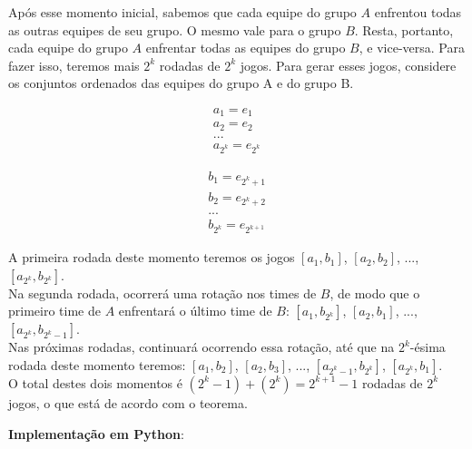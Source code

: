 \documentclass{article}
\begin{document}
Após esse momento inicial, sabemos que cada equipe do grupo $A$ enfrentou todas as outras equipes de seu grupo. O mesmo vale para o grupo $B$. Resta, portanto, cada equipe do grupo $A$ enfrentar todas as equipes do grupo $B$, e vice-versa. Para fazer isso, teremos mais $2^k$ rodadas de $2^k$ jogos. Para gerar esses jogos, considere os conjuntos ordenados das equipes do grupo A e do grupo B.

\begin{gather}
a_1 = e_1 \\
a_2 = e_2 \\
... \\
a_{2^k} = e_{2^k}\end{gather}

\begin{gather}
b_1 = e_{2^k + 1} \\
b_2 = e_{2^k + 2} \\
... \\
b_{2^k} = e_{2^{k+1}}\end{gather}

A primeira rodada deste momento teremos os jogos $[a_1, b_1]$, $[a_2, b_2]$, ..., $[a_{2^k}, b_{2^k}]$.\\

Na segunda rodada, ocorrerá uma rotação nos times de $B$, de modo que o primeiro time de $A$ enfrentará o último time de $B$: $[a_1, b_{2^k}]$, $[a_2, b_1]$, ..., $[a_{2^k}, b_{2^k-1}]$.\\

Nas próximas rodadas, continuará ocorrendo essa rotação, até que na $2^k$-ésima rodada deste momento teremos: $[a_1, b_2]$, $[a_2, b_3]$, ..., $[a_{2^k-1}, b_{2^k}]$, $[a_{2^k}, b_1]$.\\

O total destes dois momentos é $(2^k -1) + (2^k) = 2^{k+1} - 1$ rodadas de $2^k$ jogos, o que está de acordo com o teorema.

\pagebreak

\textbf{Implementação em Python}:
\end{document}
